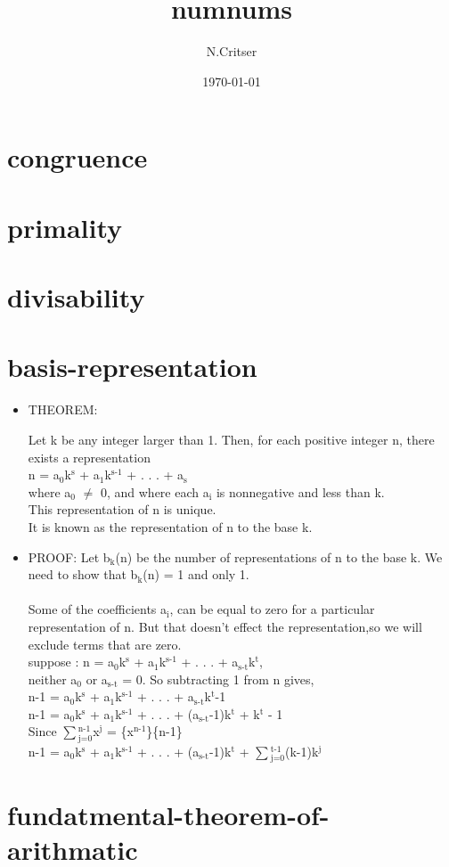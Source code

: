 \documentclass[11pt]{article}
\author{N.Critser}
\date{\today}
\title{numnums}
\begin{document}
\maketitle

\section*{congruence}
\label{sec-1}
\section*{primality}
\label{sec-2}
\section*{divisability}
\label{sec-3}
\section*{basis-representation}
\label{sec-4}
\begin{itemize}
\item THEOREM:
\label{sec-4-0-1}

Let k be any integer larger than 1. Then, for each positive integer n, there exists a representation
\\
n = a$_{\text{0}}$k$^{\text{s}}$ + a$_{\text{1}}$k$^{\text{s-1}}$ + . . . + a$_{\text{s}}$ 
\\
where a$_{\text{0}}$ $\ne$ 0, and where each a$_{\text{i}}$ is nonnegative and less than k.
\\
This representation of n is unique.
\\
It is known as the representation of n to the base k.

\item PROOF:
\label{sec-4-0-2}
Let b$_{\text{k}}$(n) be the number of representations of n to the base k.
We need to show that b$_{\text{k}}$(n) = 1 and only 1.
\\
\\
Some of the coefficients  a$_{\text{i}}$, can be equal to zero for a particular
representation of n. But that doesn't effect the representation,so we will
exclude terms that are zero.
\\
suppose : n = a$_{\text{0}}$k$^{\text{s}}$ + a$_{\text{1}}$k$^{\text{s-1}}$ + . . . + a$_{\text{s-t}}$k$^{\text{t}}$,
\\ 
neither a$_{\text{0}}$ or a$_{\text{s-t}}$ = 0. So subtracting 1 from n gives,
\\
n-1 = a$_{\text{0}}$k$^{\text{s}}$ + a$_{\text{1}}$k$^{\text{s-1}}$ + . . . + a$_{\text{s-t}}$k$^{\text{t}}$-1
\\
n-1 = a$_{\text{0}}$k$^{\text{s}}$ + a$_{\text{1}}$k$^{\text{s-1}}$ + . . . + (a$_{\text{s-t}}$-1)k$^{\text{t}}$ + k$^{\text{t}}$ - 1
\\
Since $\sum$$_{\text{j=0}}^{\text{n-1}}$x$^{\text{j}}$  =  \frac\{x$^{\text{n-1}}$\}\{n-1\}
\\
n-1 = a$_{\text{0}}$k$^{\text{s}}$ + a$_{\text{1}}$k$^{\text{s-1}}$ + . . . + (a$_{\text{s-t}}$-1)k$^{\text{t}}$ + $\sum$$_{\text{j=0}}^{\text{t-1}}$(k-1)k$^{\text{j}}$
\end{itemize}
\section*{fundatmental-theorem-of-arithmatic}
\label{sec-5}
\end{document}
